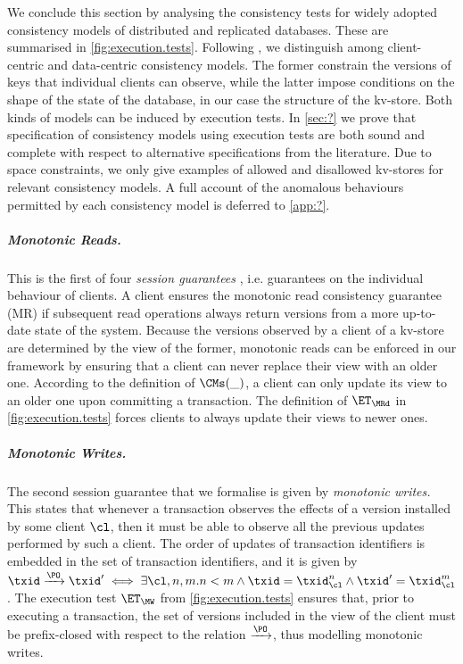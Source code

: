 We conclude this section by analysing the consistency tests for widely adopted 
consistency models of distributed and replicated databases. These are summarised 
in \cref{fig:execution.tests}.
Following \cite{}, we distinguish among client-centric and data-centric consistency models. 
The former constrain the versions of keys that individual clients can observe, while the latter 
impose conditions on the shape of the state of the database, in our case the structure of 
the kv-store. Both kinds of models can be induced by execution tests. In \cref{sec:?} 
we prove that specification of consistency models using execution tests are both sound and complete 
with respect to alternative specifications from the literature. Due to space constraints, we only give 
examples of allowed and disallowed kv-stores for relevant consistency models. A full account 
of the anomalous behaviours permitted by each consistency model is deferred to \cref{app:?}.

\subparagraph{Monotonic Reads.} 
This is the first of four \emph{session guarantees} \cite{terry1994sessions}, i.e. guarantees on the individual behaviour of 
clients.  A client ensures the monotonic read consistency guarantee (MR) if subsequent read operations always 
return versions from a more up-to-date state of the system. Because the versions observed by a client of a kv-store 
are determined by the view of the former, monotonic reads can be enforced in our framework by ensuring that 
a client can never replace their view with an older one. According to the definition of $\CMs(\_)$, 
a client can only update its view to an older one upon committing a transaction. The definition of 
$\ET_{\MRd}$ in \cref{fig:execution.tests} forces clients to always update their views to newer ones.

\subparagraph{Monotonic Writes.}
The second session guarantee that we formalise is given by \emph{monotonic writes.} This states that 
whenever a transaction observes the effects of a version installed by some client $\cl$, then 
it must be able to observe all the previous updates performed by such a client. 
The order of updates of transaction identifiers is embedded in the set of transaction identifiers, 
and it is given by $\txid \xrightarrow{\PO} \txid' \iff \exists \cl, n,m. n < m \wedge \txid = \txid_{\cl}^{n} \wedge 
\txid' = \txid_{\cl}^{m}$. The execution test $\ET_{\MW}$ from \cref{fig:execution.tests} ensures 
that, prior to executing a transaction, the set of versions included in the view of the client 
must be prefix-closed with respect to the relation $\xrightarrow{\PO}$, thus modelling 
monotonic writes.

